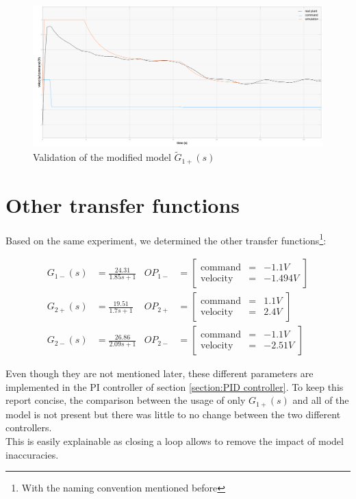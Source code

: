\begin{figure}[H]
    \centering
    \includegraphics[width=\textwidth]{Pictures/validation_A0_30.png}
    \caption{Validation of the modified model $\tilde{G}_{1+}(s)$}
    \label{fig:validation_A0_30}
\end{figure}

\section{Other transfer functions}

Based on the same experiment, we determined the other transfer functions\footnote{With the naming convention mentioned 
before}:

\begin{align}
    G_{1-}(s) &= \frac{24.31}{1.85 s + 1} & OP_{1-} &= \begin{bmatrix}
                \text{command} & = & -1.1 V \\
                \text{velocity} & = & -1.494 V
                \end{bmatrix} 
    \label{TF_mot1_-} \\
    G_{2+}(s) &= \frac{19.51}{1.7 s + 1} & OP_{2+} &= \begin{bmatrix}
                \text{command} & = & 1.1 V \\
                \text{velocity} & = & 2.4 V
                \end{bmatrix} 
    \label{TF_mot2_+} \\
    G_{2-}(s) &= \frac{26.86}{2.09 s + 1} & OP_{2-} &= \begin{bmatrix}
                \text{command} & = & -1.1 V \\
                \text{velocity} & = & -2.51 V
                \end{bmatrix} 
    \label{TF_mot2_-}
\end{align}

Even though they are not mentioned later, these different parameters are implemented in the PI controller of section \ref{section:PID controller}. To keep this report concise, the comparison between the usage of only $G_{1+}(s)$ and all of the model is not present but there was little to no change between the two different controllers.\\
This is easily explainable as closing a loop allows to remove the impact of model inaccuracies.
